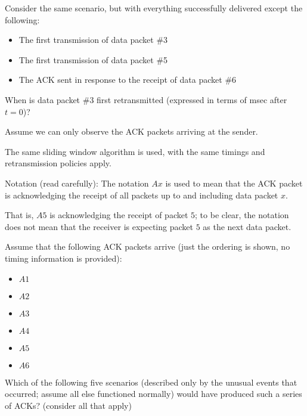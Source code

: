 \documentclass{supervision}
\begin{document}
\begin{questions}
\begin{parts}
\begin{subparts}
              \subpart Consider the same scenario, but with everything
                successfully delivered except the following:
                \begin{itemize}
                  \item The first transmission of data packet \#3
                  \item The first transmission of data packet \#5
                  \item The ACK sent in response to the receipt of data packet
                    \#6
                \end{itemize}

                When is data packet \#3 first retransmitted (expressed in terms
                of msec after $t=0$)?

              \subpart Assume we can only observe the ACK packets arriving at
                the sender.

                The same sliding window algorithm is used, with the same
                timings and retransmission policies apply.

                Notation (read carefully): The notation $Ax$ is used to mean
                that the ACK packet is acknowledging the receipt of all packets
                up to and including data packet $x$.

                That is, $A5$ is acknowledging the receipt of packet $5$; to be
                clear, the notation does not mean that the receiver is
                expecting packet $5$ as the next data packet.

                Assume that the following ACK packets arrive (just the ordering
                is shown, no timing information is provided):

                \begin{itemize}
                  \item $A1$
                  \item $A2$
                  \item $A3$
                  \item $A4$
                  \item $A5$
                  \item $A6$
                \end{itemize}

                Which of the following five scenarios (described only by the
                unusual events that occurred; assume all else functioned
                normally) would have produced such a series of ACKs? (consider
                all that apply)


\end{subparts}
\end{parts}
\end{questions}
\end{document}
